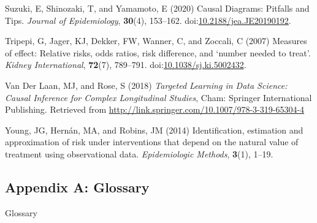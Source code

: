 \documentclass[
  single column]{article}
\newlength{\cslhangindent}
\newenvironment{CSLReferences}[2] %
 {\begin{list}{}{%
  \setlength{\itemindent}{0pt}
  \setlength{\leftmargin}{0pt}
  \setlength{\parsep}{0pt}
  \ifodd #1
   \setlength{\leftmargin}{\cslhangindent}
   \setlength{\itemindent}{-1\cslhangindent}
  \fi
  \setlength{\itemsep}{#2\baselineskip}}}
 {\end{list}}
\begin{document}
\begin{CSLReferences}{1}{0}
Suzuki, E, Shinozaki, T, and Yamamoto, E (2020) Causal Diagrams:
Pitfalls and Tips. \emph{Journal of Epidemiology}, \textbf{30}(4),
153--162.
doi:\href{https://doi.org/10.2188/jea.JE20190192}{10.2188/jea.JE20190192}.

Tripepi, G, Jager, KJ, Dekker, FW, Wanner, C, and Zoccali, C (2007)
Measures of effect: Relative risks, odds ratios, risk difference, and
{`}number needed to treat{'}. \emph{Kidney International},
\textbf{72}(7), 789--791.
doi:\href{https://doi.org/10.1038/sj.ki.5002432}{10.1038/sj.ki.5002432}.

Van Der Laan, MJ, and Rose, S (2018) \emph{Targeted Learning in Data
Science: Causal Inference for Complex Longitudinal Studies}, Cham:
Springer International Publishing. Retrieved from
\url{http://link.springer.com/10.1007/978-3-319-65304-4}

Young, JG, Hernán, MA, and Robins, JM (2014) Identification, estimation
and approximation of risk under interventions that depend on the natural
value of treatment using observational data. \emph{Epidemiologic
Methods}, \textbf{3}(1), 1--19.

\end{CSLReferences}

\newpage{}

\subsection{Appendix A: Glossary}\label{id-app-a}

\begin{table}

\caption{\label{tbl-experiments}Glossary}

\centering{

\glossaryTerms

}

\end{table}%
\end{document}
